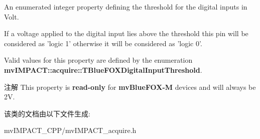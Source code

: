 An enumerated integer property defining the threshold for the digital inputs in Volt. 

If a voltage applied to the digital input lies above the threshold this pin will be considered as 'logic 1' otherwise it will be considered as 'logic 0'.

Valid values for this property are defined by the enumeration {\bfseries mv\+I\+M\+P\+A\+C\+T\+::acquire\+::\+T\+Blue\+F\+O\+X\+Digital\+Input\+Threshold}.

\begin{DoxyNote}{注解}
This property is {\bfseries read-\/only} for {\bfseries mv\+Blue\+F\+O\+X-\/\+M} devices and will always be 2\+V. 
\end{DoxyNote}


该类的文档由以下文件生成\+:\begin{DoxyCompactItemize}
\item 
mv\+I\+M\+P\+A\+C\+T\+\_\+\+C\+P\+P/mv\+I\+M\+P\+A\+C\+T\+\_\+acquire.\+h\end{DoxyCompactItemize}
